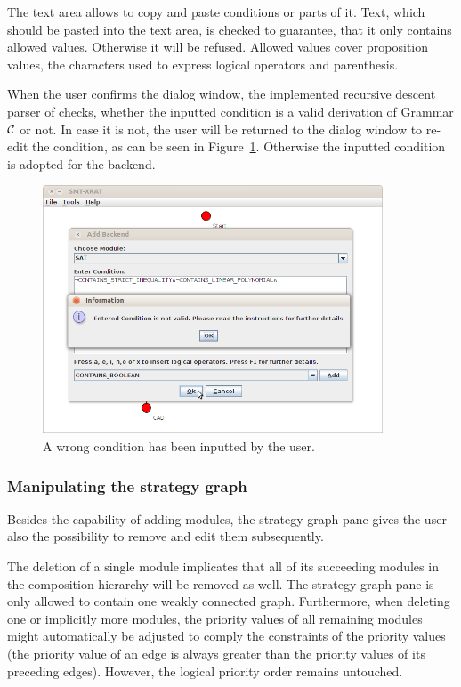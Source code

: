 The text area allows to copy and paste conditions or parts of it. Text, which should
be pasted into the text area, is checked to guarantee, that it only contains allowed
values. Otherwise it will be refused. Allowed values cover proposition values, the
characters used to express logical operators and parenthesis.

When the user confirms the dialog window, the implemented recursive descent parser of
\smtxrat checks, whether the inputted condition is a valid derivation of Grammar
$\cal C$ or not. In case it is not, the user will be returned to the dialog window
to re-edit the condition, as can be seen in Figure~\ref{fig:smt-xrat_condition_wrong}.
Otherwise the inputted condition is adopted for the backend.

\begin{figure}
  \begin{center}
    \includegraphics[width=0.9\textwidth]{graphics/smt-xrat_condition_wrong.png}
  \end{center}
  \caption{A wrong condition has been inputted by the user.}
  \label{fig:smt-xrat_condition_wrong}
\end{figure}

\subsubsection{Manipulating the strategy graph}
\label{sec:manipulating_the_strategy_graph}
Besides the capability of adding modules, the strategy graph pane gives the user
also the possibility to remove and edit them subsequently.

The deletion of a single module implicates that all of its succeeding modules in
the composition hierarchy will be removed as well. The strategy graph pane is only
allowed to contain one weakly connected graph. Furthermore, when deleting
one or implicitly more modules, the priority values of all remaining modules might
automatically be adjusted to comply the constraints of the priority values (the priority
value of an edge is always greater than the priority values of its preceding edges).
However, the logical priority order remains untouched.

